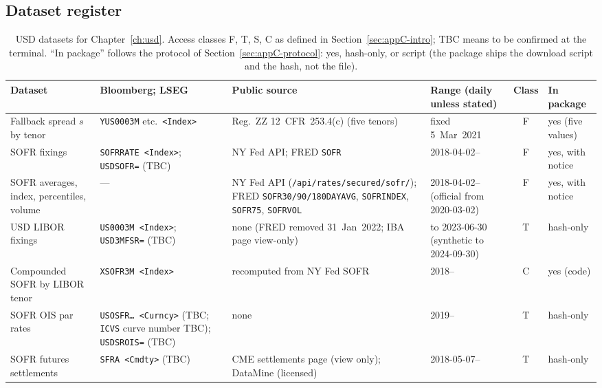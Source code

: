 
\subsection{Dataset register}\label{appC:usd-register}

\begin{table}[htbp]
\centering\scriptsize
\caption{USD datasets for Chapter~\ref{ch:usd}. Access classes F, T, S, C as defined in Section~\ref{sec:appC-intro}; TBC means to be confirmed at the terminal. ``In package'' follows the protocol of Section~\ref{sec:appC-protocol}: yes, hash-only, or script (the package ships the download script and the hash, not the file).}
\label{tab:usd-register}
\begin{tabular}{@{}p{2.4cm}p{3.0cm}p{2.3cm}p{2.1cm}cp{1.6cm}@{}}
\toprule
Dataset & Bloomberg; LSEG & Public source & Range (daily unless stated) & Class & In package \\
\midrule
Fallback spread $s$ by tenor & \texttt{YUS0003M} etc.\ \texttt{<Index>} & Reg.~ZZ 12~CFR~253.4(c) (five tenors) & fixed 5~Mar~2021 & F & yes (five values) \\
SOFR fixings & \texttt{SOFRRATE <Index>}; \texttt{USDSOFR=} (TBC) & NY Fed API; FRED \texttt{SOFR} & 2018-04-02-- & F & yes, with notice \\
SOFR averages, index, percentiles, volume & --- & NY Fed API (\texttt{/api/rates/secured/sofr/}); FRED \texttt{SOFR30/90/180DAYAVG}, \texttt{SOFRINDEX}, \texttt{SOFR75}, \texttt{SOFRVOL} & 2018-04-02-- (official from 2020-03-02) & F & yes, with notice \\
USD LIBOR fixings & \texttt{US0003M <Index>}; \texttt{USD3MFSR=} (TBC) & none (FRED removed 31~Jan~2022; IBA page view-only) & to 2023-06-30 (synthetic to 2024-09-30) & T & hash-only \\
Compounded SOFR by LIBOR tenor & \texttt{XSOFR3M <Index>} & recomputed from NY Fed SOFR & 2018-- & C & yes (code) \\
SOFR OIS par rates & \texttt{USOSFR\ldots\ <Curncy>} (TBC; \texttt{ICVS} curve number TBC); \texttt{USDSROIS=} (TBC) & none & 2019-- & T & hash-only \\
SOFR futures settlements & \texttt{SFRA <Cmdty>} (TBC) & CME settlements page (view only); DataMine (licensed) & 2018-05-07-- & T & hash-only \\

\end{tabular}
\end{table}
